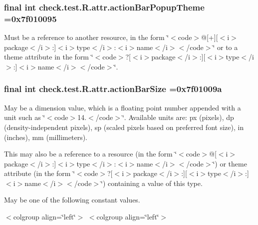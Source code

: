 \subsubsection[{action\+Bar\+Popup\+Theme}]{\setlength{\rightskip}{0pt plus 5cm}final int check.\+test.\+R.\+attr.\+action\+Bar\+Popup\+Theme =0x7f010095\hspace{0.3cm}{\ttfamily [static]}}\label{classcheck_1_1test_1_1_r_1_1attr_a4ab4b2cb9a1376a8d56e464bd8eb74a2}
Must be a reference to another resource, in the form \char`\"{}$<$code$>$@\mbox{[}+\mbox{]}\mbox{[}$<$i$>$package$<$/i$>$\+:\mbox{]}$<$i$>$type$<$/i$>$\+:$<$i$>$name$<$/i$>$$<$/code$>$\char`\"{} or to a theme attribute in the form \char`\"{}$<$code$>$?\mbox{[}$<$i$>$package$<$/i$>$\+:\mbox{]}\mbox{[}$<$i$>$type$<$/i$>$\+:\mbox{]}$<$i$>$name$<$/i$>$$<$/code$>$\char`\"{}. \hypertarget{classcheck_1_1test_1_1_r_1_1attr_a402641d680366de8aaf8c4fb48bda10f}{}
\subsubsection[{action\+Bar\+Size}]{\setlength{\rightskip}{0pt plus 5cm}final int check.\+test.\+R.\+attr.\+action\+Bar\+Size =0x7f01009a\hspace{0.3cm}{\ttfamily [static]}}\label{classcheck_1_1test_1_1_r_1_1attr_a402641d680366de8aaf8c4fb48bda10f}
May be a dimension value, which is a floating point number appended with a unit such as \char`\"{}$<$code$>$14.\+5sp$<$/code$>$\char`\"{}. Available units are\+: px (pixels), dp (density-\/independent pixels), sp (scaled pixels based on preferred font size), in (inches), mm (millimeters). 

This may also be a reference to a resource (in the form \char`\"{}$<$code$>$@\mbox{[}$<$i$>$package$<$/i$>$\+:\mbox{]}$<$i$>$type$<$/i$>$\+:$<$i$>$name$<$/i$>$$<$/code$>$\char`\"{}) or theme attribute (in the form \char`\"{}$<$code$>$?\mbox{[}$<$i$>$package$<$/i$>$\+:\mbox{]}\mbox{[}$<$i$>$type$<$/i$>$\+:\mbox{]}$<$i$>$name$<$/i$>$$<$/code$>$\char`\"{}) containing a value of this type. 

May be one of the following constant values.

\begin{TabularC}{0}
\hline
\end{TabularC}
$<$colgroup align=\char`\"{}left\char`\"{}$>$ $<$colgroup align=\char`\"{}left\char`\"{}$>$ 

